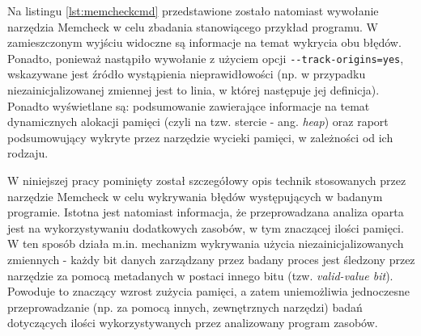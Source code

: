Na listingu \ref{lst:memcheckcmd} przedstawione zostało natomiast wywołanie narzędzia Memcheck w celu zbadania stanowiącego przykład programu. W zamieszczonym wyjściu widoczne są informacje na temat wykrycia obu błędów. Ponadto, ponieważ nastąpiło wywołanie z użyciem opcji \lstinline{--track-origins=yes}, wskazywane jest źródło wystąpienia nieprawidłowości (np. w przypadku niezainicjalizowanej zmiennej jest to linia, w której następuje jej definicja). Ponadto wyświetlane są: podsumowanie zawierające informacje na temat dynamicznych alokacji pamięci (czyli na tzw. stercie - ang. \emph{heap}) oraz raport podsumowujący wykryte przez narzędzie wycieki pamięci, w zależności od ich rodzaju.



W niniejszej pracy pominięty został szczegółowy opis technik stosowanych przez narzędzie Memcheck w celu wykrywania błędów występujących w badanym programie. Istotna jest natomiast informacja, że przeprowadzana analiza oparta jest na wykorzystywaniu dodatkowych zasobów, w tym znaczącej ilości pamięci. W ten sposób działa m.in. mechanizm wykrywania użycia niezainicjalizowanych zmiennych - każdy bit danych zarządzany przez badany proces jest śledzony przez narzędzie za pomocą metadanych w postaci innego bitu (tzw. \emph{valid-value bit}). Powoduje to znaczący wzrost zużycia pamięci, a zatem uniemożliwia jednoczesne przeprowadzanie (np. za pomocą innych, zewnętrznych narzędzi) badań dotyczących ilości wykorzystywanych przez analizowany program zasobów.

